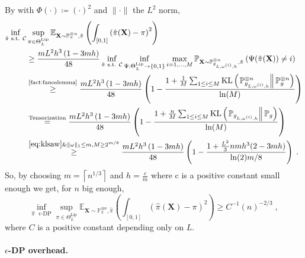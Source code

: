 \documentclass[10pt]{article} %
\newcommand{\Prob}[0]{\mathbb{P}}
\newcommand{\E}[0]{\mathbb{E}}
\newcommand\vect[1]{\mathbf{#1}}
\newcommand\kl[2]{\mathrm{KL}\left( \left. {#1}\right\Vert {#2} \right)}
\newcommand\p[1]{\left( {#1}\right)}
\newcommand\ceil[1]{\left\lceil {#1}\right\rceil}
\begin{document}
By  with $\Phi(\cdot) \coloneqq (\cdot)^2$ and $\|\cdot\|$ the $L^2$ norm,
\begin{equation}
\label{eq:dqslijuhfvsjkdcv}
    \begin{aligned}
    \inf_{\hat{\pi}  \text{ s.t. } \mathcal{C}} &\sup_{\pi \in \Theta^{\text{Lip}}_L}
    \E_{\vect{X} \sim \Prob_{\pi}^{\otimes n}, \hat{\pi}}\p{ \int_{[0, 1]}\p{\hat{\pi}(\vect{X})- \pi}^2} \\
    &\geq 
    \frac{mL^2 h^3\p{1 - 3 mh}}{48}
    \inf_{\hat{\pi}  \text{ s.t. } \mathcal{C}} \inf_{\Psi : \Theta^{\text{Lip}}_L \rightarrow \{0, 1\}}
    \max_{i = 1, \dots, M}  \Prob_{\vect{X} \sim \Prob_{g_{L, \omega^{(i)}, h}}^{\otimes n}, \hat{\pi}}                \p{\Psi(\hat{\pi}(\vect{X})) \neq i}  \\
    &\stackrel{\text{\Cref{fact:fanoslemma}}}{\geq}
    \frac{mL^2h^3\p{1 - 3 mh}}{48}
    \p{1 - \frac{1 + \frac{1}{M} \sum_{1\leq i\leq M} \kl{\Prob_{g_{L, \omega^{(i)}, h}}^{\otimes n}}{\Prob_{g}^{\otimes n}}}{\ln (M)}} \\
    &\stackrel{\text{Tensorization}}{=}
    \frac{mL^2 h^3\p{1 - 3 mh}}{48}
    \p{1 - \frac{1 + \frac{n}{M} \sum_{1\leq i\leq M} \kl{\Prob_{g_{L, \omega^{(i)}, h}}}{\Prob_{g}}}{\ln (M)}} \\
    &\stackrel{\eqref{eq:klsaw} \& \|\omega\|_1\leq m, M \geq 2^{m/8}}{\geq}
    \frac{mL^2 h^3\p{1 - 3 mh}}{48}
    \p{1 - \frac{1 +  \frac{L^2}{3}n m h^3 (2 - 3m h)}{\ln(2) m/8}} \;.
    \end{aligned}
\end{equation}
So, by choosing $m = \ceil{n^{
1/3}}$ and $h = \frac{c}{m}$ where c is a positive constant small enough we get, for $n$ big enough, 
\begin{equation*}
    \inf_{\hat{\pi} \text{ $\epsilon$-DP}} \sup_{\pi \in \Theta^{\text{Lip}}_L}
    \E_{\vect{X} \sim \Prob_{\pi}^{\otimes n}, \hat{\pi}}\p{ \int_{[0, 1]}\p{\hat{\pi}(\vect{X})- \pi}^2} \geq C^{-1} (n)^{-2/3} \;,
\end{equation*}
where $C$ is a positive constant depending only on $L$.

\paragraph{$\epsilon$-DP overhead.}
\end{document}
